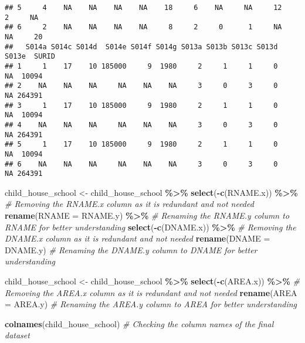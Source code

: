 \documentclass[
]{article}
\newenvironment{Shaded}{\begin{snugshade}}{\end{snugshade}}
\newcommand{\AttributeTok}[1]{\textcolor[rgb]{0.13,0.29,0.53}{#1}}
\newcommand{\CommentTok}[1]{\textcolor[rgb]{0.56,0.35,0.01}{\textit{#1}}}
\newcommand{\FunctionTok}[1]{\textcolor[rgb]{0.13,0.29,0.53}{\textbf{#1}}}
\newcommand{\NormalTok}[1]{#1}
\newcommand{\OtherTok}[1]{\textcolor[rgb]{0.56,0.35,0.01}{#1}}
\newcommand{\SpecialCharTok}[1]{\textcolor[rgb]{0.81,0.36,0.00}{\textbf{#1}}}
\begin{document}
\begin{verbatim}
## 5     4    NA    NA    NA    NA    18     6    NA     NA     12      2     NA
## 6     2    NA    NA    NA    NA     8     2     0      1     NA     NA     20
##   S014a S014c S014d  S014e S014f S014g S013a S013b S013c S013d S013e  SURID
## 1     1    17    10 185000     9  1980     2     1     1     0    NA  10094
## 2    NA    NA    NA     NA    NA    NA     3     0     3     0    NA 264391
## 3     1    17    10 185000     9  1980     2     1     1     0    NA  10094
## 4    NA    NA    NA     NA    NA    NA     3     0     3     0    NA 264391
## 5     1    17    10 185000     9  1980     2     1     1     0    NA  10094
## 6    NA    NA    NA     NA    NA    NA     3     0     3     0    NA 264391
\end{verbatim}

\begin{Shaded}
\begin{Highlighting}[]
\NormalTok{child\_house\_school }\OtherTok{\textless{}{-}}\NormalTok{ child\_house\_school }\SpecialCharTok{\%\textgreater{}\%} 
  \FunctionTok{select}\NormalTok{(}\SpecialCharTok{{-}}\FunctionTok{c}\NormalTok{(RNAME.x)) }\SpecialCharTok{\%\textgreater{}\%} \CommentTok{\# Removing the RNAME.x column as it is redundant and not needed}
  \FunctionTok{rename}\NormalTok{(}\AttributeTok{RNAME =}\NormalTok{ RNAME.y) }\SpecialCharTok{\%\textgreater{}\%} \CommentTok{\# Renaming the RNAME.y column to RNAME for better understanding}
  \FunctionTok{select}\NormalTok{(}\SpecialCharTok{{-}}\FunctionTok{c}\NormalTok{(DNAME.x)) }\SpecialCharTok{\%\textgreater{}\%} \CommentTok{\# Removing the DNAME.x column as it is redundant and not needed}
  \FunctionTok{rename}\NormalTok{(}\AttributeTok{DNAME =}\NormalTok{ DNAME.y) }\CommentTok{\# Renaming the DNAME.y column to DNAME for better understanding}

\NormalTok{child\_house\_school }\OtherTok{\textless{}{-}}\NormalTok{ child\_house\_school }\SpecialCharTok{\%\textgreater{}\%} 
  \FunctionTok{select}\NormalTok{(}\SpecialCharTok{{-}}\FunctionTok{c}\NormalTok{(AREA.x)) }\SpecialCharTok{\%\textgreater{}\%} \CommentTok{\# Removing the AREA.x column as it is redundant and not needed}
  \FunctionTok{rename}\NormalTok{(}\AttributeTok{AREA =}\NormalTok{ AREA.y) }\CommentTok{\# Renaming the AREA.y column to AREA for better understanding}

\FunctionTok{colnames}\NormalTok{(child\_house\_school) }\CommentTok{\# Checking the column names of the final dataset}
\end{Highlighting}
\end{Shaded}
\end{document}
